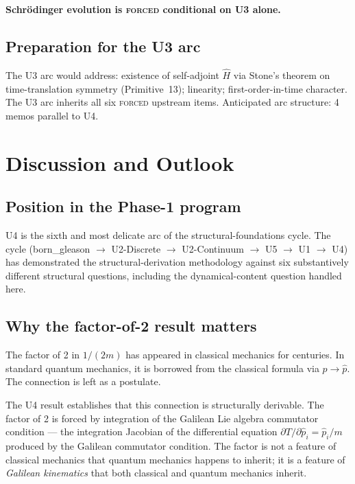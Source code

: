 \documentclass[11pt,a4paper]{article}
\begin{document}
\textbf{Schr\"odinger evolution is \textsc{forced} conditional on U3 alone.}

\subsection{Preparation for the U3 arc}

The U3 arc would address: existence of self-adjoint $\hat{H}$ via Stone's theorem on time-translation symmetry (Primitive~13); linearity; first-order-in-time character. The U3 arc inherits all six \textsc{forced} upstream items. Anticipated arc structure: 4 memos parallel to U4.

\section{Discussion and Outlook}\label{sec:discussion}

\subsection{Position in the Phase-1 program}

U4 is the sixth and most delicate arc of the structural-foundations cycle. The cycle (born\_gleason $\to$ U2-Discrete $\to$ U2-Continuum $\to$ U5 $\to$ U1 $\to$ U4) has demonstrated the structural-derivation methodology against six substantively different structural questions, including the dynamical-content question handled here.

\subsection{Why the factor-of-2 result matters}

The factor of 2 in $1/(2m)$ has appeared in classical mechanics for centuries. In standard quantum mechanics, it is borrowed from the classical formula via $p \to \hat{p}$. The connection is left as a postulate.

The U4 result establishes that this connection is structurally derivable. The factor of 2 is forced by integration of the Galilean Lie algebra commutator condition --- the integration Jacobian of the differential equation $\partial T/\partial \hat{p}_i = \hat{p}_i / m$ produced by the Galilean commutator condition. The factor is not a feature of classical mechanics that quantum mechanics happens to inherit; it is a feature of \emph{Galilean kinematics} that both classical and quantum mechanics inherit.
\end{document}
